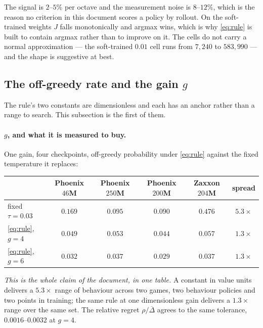 \documentclass{article}
\newcommand{\gapbar}{\overline{\Delta}}
\begin{document}
The signal is $2$--$5\%$ per octave and the measurement noise is $8$--$12\%$, which is the reason
no criterion in this document scores a policy by rollout. On the soft-trained weights $J$ falls
monotonically and argmax wins, which is why \eqref{eq:rule} is built to contain argmax rather than
to improve on it. The cells do not carry a normal approximation --- the soft-trained $0.01$ cell
runs from $7{,}240$ to $583{,}990$ --- and the shape is suggestive at best.


\subsection{The off-greedy rate and the gain $g$}
\label{sec:meas-g}

The rule's two constants are dimensionless and each has an anchor rather than a range to
search. This subsection is the first of them.

\paragraph{$g$, and what it is measured to buy.} One gain, four checkpoints, off-greedy
probability under \eqref{eq:rule} against the fixed temperature it replaces:

\begin{center}
\small
\begin{tabular}{lccccc}
  \toprule
  & Phoenix $46$M & Phoenix $250$M & Phoenix $200$M & Zaxxon $204$M & spread \\
  \midrule
  fixed $\tau = 0.03$      & $0.169$ & $0.095$ & $0.090$ & $0.476$ & $5.3\times$ \\
  \eqref{eq:rule}, $g = 4$ & $0.049$ & $0.053$ & $0.044$ & $0.057$ & $1.3\times$ \\
  \eqref{eq:rule}, $g = 6$ & $0.032$ & $0.037$ & $0.029$ & $0.037$ & $1.3\times$ \\
  \bottomrule
\end{tabular}
\end{center}

\emph{This is the whole claim of the document, in one table.} A constant in value units delivers
a $5.3\times$ range of behaviour across two games, two behaviour policies and two points in
training; the same rule at one dimensionless gain delivers a $1.3\times$ range over the same set.
The relative regret $\rho/\gapbar$ agrees to the same tolerance, $0.0016$--$0.0032$ at $g = 4$.
\end{document}
